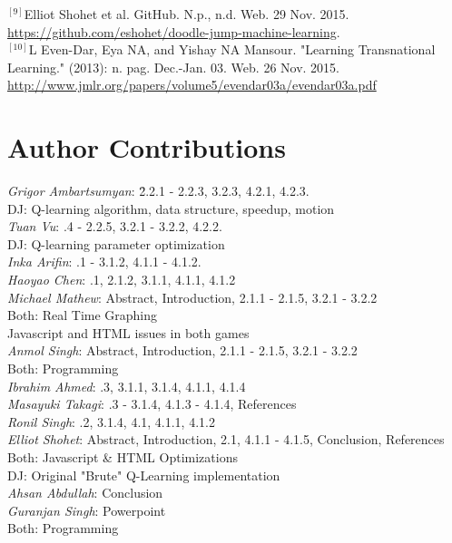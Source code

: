 \documentclass[a4paper, 12pt]{article}
\begin{document}
$^{[9]}$Elliot Shohet et al. GitHub. N.p., n.d. Web. 29 Nov. 2015. \url{https://github.com/eshohet/doodle-jump-machine-learning}.\\

$^{[10]}$L Even-Dar, Eya NA, and Yishay NA Mansour. "Learning Transnational Learning." (2013): n. pag. Dec.-Jan. 03. Web. 26 Nov. 2015.
\url{http://www.jmlr.org/papers/volume5/evendar03a/evendar03a.pdf}


\newpage
\section{Author Contributions}
\begin{tabbing}
\textit{Grigor Ambartsumyan}: \= 2.2.1 - 2.2.3, 3.2.3, 4.2.1, 4.2.3.\\
\> DJ: Q-learning algorithm, data structure, speedup, motion   \\
\textit{Tuan Vu}:  .4 - 2.2.5, 3.2.1 - 3.2.2, 4.2.2.\\
\> DJ: Q-learning parameter optimization\\
\textit{Inka Arifin}: .1 - 3.1.2, 4.1.1 - 4.1.2.\\
\textit{Haoyao Chen}: .1, 2.1.2, 3.1.1, 4.1.1, 4.1.2\\
\textit{Michael Mathew}: \> Abstract, Introduction, 2.1.1 - 2.1.5, 3.2.1 - 3.2.2\\
\> Both: Real Time Graphing\\
\> Javascript and HTML issues in both games\\
\textit{Anmol Singh}: \> Abstract, Introduction, 2.1.1 - 2.1.5, 3.2.1 - 3.2.2\\
\> Both: Programming\\
\textit{Ibrahim Ahmed}: .3, 3.1.1, 3.1.4, 4.1.1, 4.1.4\\
\textit{Masayuki Takagi}: .3 - 3.1.4, 4.1.3 - 4.1.4, References\\
\textit{Ronil Singh}: .2, 3.1.4, 4.1, 4.1.1, 4.1.2\\
\textit{Elliot Shohet}: \> Abstract, Introduction, 2.1, 4.1.1 - 4.1.5, Conclusion, References\\
\> Both: Javascript \& HTML Optimizations\\
\> DJ: Original "Brute" Q-Learning implementation\\
\textit{Ahsan Abdullah}: \> Conclusion\\
\textit{Guranjan Singh}: \> Powerpoint\\
\>Both: Programming \\
\end{tabbing}
\end{document}

